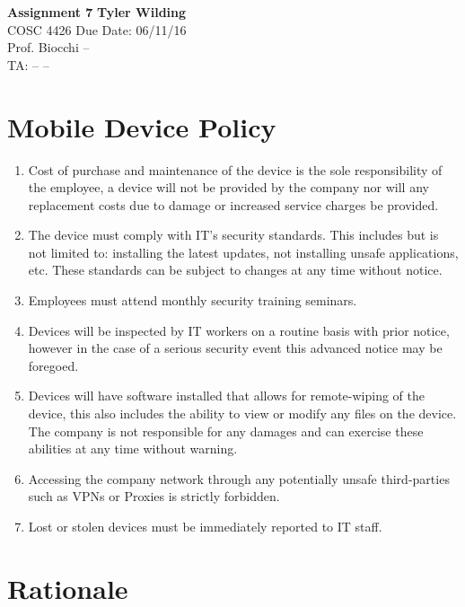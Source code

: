 \documentclass[a4paper, 11pt]{article}
\begin{document}
\noindent
\large\textbf{Assignment 7} \hfill \textbf{Tyler Wilding} \\
\normalsize COSC 4426 \hfill Due Date: 06/11/16 \\
Prof. Biocchi \hfill -- \\
TA: -- \hfill --

\section*{Mobile Device Policy}
\begin{enumerate}
\item Cost of purchase and maintenance of the device is the sole responsibility of the employee, a device will not be provided by the company nor will any replacement costs due to damage or increased service charges be provided.
\item The device must comply with IT's security standards.  This includes but is not limited to: installing the latest updates, not installing unsafe applications, etc.  These standards can be subject to changes at any time without notice.
\item Employees must attend monthly security training seminars.
\item Devices will be inspected by IT workers on a routine basis with prior notice, however in the case of a serious security event this advanced notice may be foregoed.
\item Devices will have software installed that allows for remote-wiping of the device, this also includes the ability to view or modify any files on the device.  The company is not responsible for any damages and can exercise these abilities at any time without warning.
\item Accessing the company network through any potentially unsafe third-parties such as VPNs or Proxies is strictly forbidden.
\item Lost or stolen devices must be immediately reported to IT staff.
\end{enumerate}

\section*{Rationale}
\end{document}
